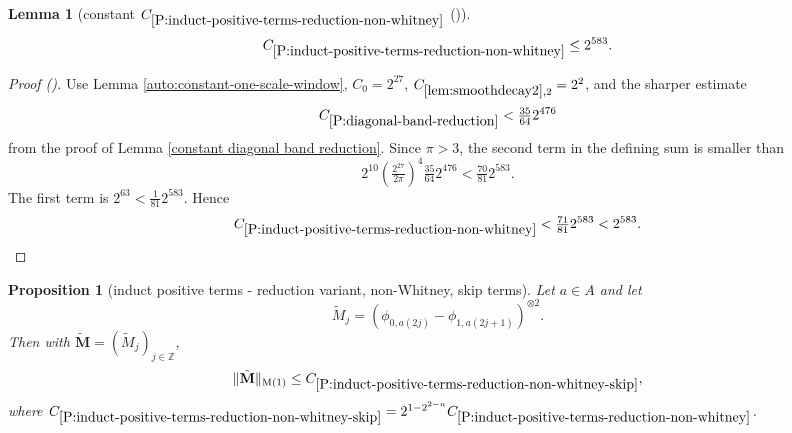 \documentclass[12pt,reqno]{amsart}
\newcommand{\auto}{{({\tiny\faCar})}}
\theoremstyle{plain}
\newtheorem{lemma}[theorem]{Lemma}
\newtheorem{proposition}[theorem]{Proposition}
\numberwithin{equation}{section}
\theoremstyle{remark}
\newcommand{\using}[1]{}
\newcommand{\Z}{{\mathbb Z}}
\newcommand{\M}{\mathbf{M}}
\begin{document}
\begin{lemma}[constant $C_{\ref{P:induct-positive-terms-reduction-non-whitney}}$ \auto]\label{constant non Whitney reduction}\using{auto:constant-one-scale-window}\using{lem:smoothdecay2}\using{P:diagonal-band-reduction}\using{constant diagonal band reduction}\using{P:induct-positive-terms-reduction-non-whitney}
\begin{equation}\label{constant non Whitney reduction bound}
C_{\ref{P:induct-positive-terms-reduction-non-whitney}}\le2^{583}.
\end{equation}
\end{lemma}
\begin{proof}[Proof \auto]
Use Lemma \ref{auto:constant-one-scale-window}, $C_0=2^{27}$, $C_{\ref{lem:smoothdecay2},2}=2^2$, and the sharper estimate
\[
C_{\ref{P:diagonal-band-reduction}}<\tfrac{35}{64}2^{476}
\]
from the proof of Lemma \ref{constant diagonal band reduction}. Since $\pi>3$, the second term in the defining sum is smaller than
\[
2^{10}\left(\tfrac{2^{27}}{2\pi}\right)^4\tfrac{35}{64}2^{476}
<\tfrac{70}{81}2^{583}.
\]
The first term is $2^{63}<\frac1{81}2^{583}$. Hence
\[
C_{\ref{P:induct-positive-terms-reduction-non-whitney}}
<\tfrac{71}{81}2^{583}<2^{583}.
\]
\end{proof}


\begin{proposition}[induct positive terms - reduction variant, non-Whitney, skip terms]
\label{P:induct-positive-terms-reduction-non-whitney-skip}\using{positive terms}\using{P:induct-positive-terms-reduction-non-whitney}
Let $a\in A$ and let
\begin{equation}\label{auto:skipped-non-Whitney-kernel}\tilde{M}_j=({\phi}_{0,a(2j)}-{\phi}_{1,a(2j+1)})^{\otimes 2}.\end{equation}
Then with $\tilde{\M}=(\tilde{M}_j)_{j\in \Z}$,
\begin{equation}\label{E:est-skipped-terms}
\|\tilde{\M}\|_{\rm M(1)}\le C_{\ref{P:induct-positive-terms-reduction-non-whitney-skip}},
\end{equation}
where $C_{\ref{P:induct-positive-terms-reduction-non-whitney-skip}}= 2^{1-2^{2-n}} C_{\ref{P:induct-positive-terms-reduction-non-whitney}}$.
\end{proposition}
\end{document}
